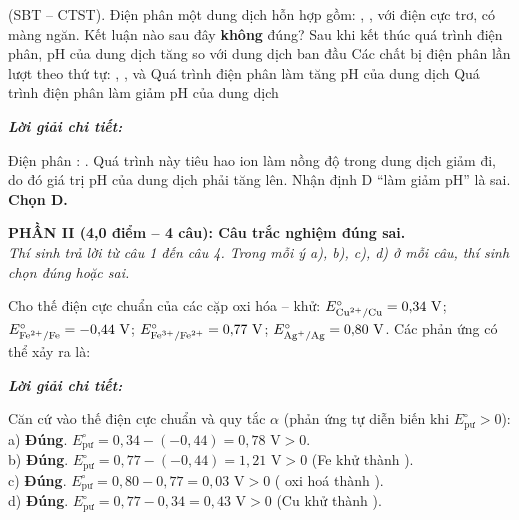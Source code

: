 \documentclass[11pt,a4paper]{article}
\def\loigiai#1{
\par\begingroup\color{blue!80!black}\small
\noindent\textbf{\textit{Lời giải chi tiết:}}\par
#1\par\endgroup}
\begin{document}
\begin{ex}
(SBT -- CTST). Điện phân một dung dịch hỗn hợp gồm: , ,  với điện cực trơ, có màng ngăn. Kết luận nào sau đây \textbf{không} đúng?
\choice
{Sau khi kết thúc quá trình điện phân, pH của dung dịch tăng so với dung dịch ban đầu}
{Các chất bị điện phân lần lượt theo thứ tự: , ,  và }
{Quá trình điện phân  làm tăng pH của dung dịch}
{\True Quá trình điện phân  làm giảm pH của dung dịch}
\loigiai{
Điện phân \ce{HCl}: . Quá trình này tiêu hao ion \ce{H+} làm nồng độ \ce{H+} trong dung dịch giảm đi, do đó giá trị pH của dung dịch phải tăng lên. Nhận định D ``làm giảm pH'' là sai.\\
\textbf{Chọn D.}}
\end{ex}



\noindent
\textbf{PHẦN II (4,0 điểm -- 4 câu): Câu trắc nghiệm đúng sai.}\\
\textit{Thí sinh trả lời từ câu 1 đến câu 4. Trong mỗi ý a), b), c), d) ở mỗi câu, thí sinh chọn đúng hoặc sai.}

\setcounter{ex}{0}

\begin{ex}
Cho thế điện cực chuẩn của các cặp oxi hóa – khử: $E^\circ_{\ce{Cu^2+/Cu}} = 0{,}34\text{ V}$; $E^\circ_{\ce{Fe^2+/Fe}} = -0{,}44\text{ V}$; $E^\circ_{\ce{Fe^3+/Fe^2+}} = 0{,}77\text{ V}$; $E^\circ_{\ce{Ag+/Ag}} = 0{,}80\text{ V}$. Các phản ứng có thể xảy ra là:
\choiceTF
{\True {}}
{\True {}}
{\True {}}
{\True {}}
\loigiai{
Căn cứ vào thế điện cực chuẩn và quy tắc $\alpha$ (phản ứng tự diễn biến khi $E^\circ_{\text{pư}} > 0$):\\
a) \textbf{Đúng}. $E^\circ_{\text{pư}} = 0{,}34 - (-0{,}44) = 0{,}78\text{ V} > 0$.\\
b) \textbf{Đúng}. $E^\circ_{\text{pư}} = 0{,}77 - (-0{,}44) = 1{,}21\text{ V} > 0$ (Fe khử \ce{Fe^3+} thành \ce{Fe^2+}).\\
c) \textbf{Đúng}. $E^\circ_{\text{pư}} = 0{,}80 - 0{,}77 = 0{,}03\text{ V} > 0$ (\ce{Ag+} oxi hoá \ce{Fe^2+} thành \ce{Fe^3+}).\\
d) \textbf{Đúng}. $E^\circ_{\text{pư}} = 0{,}77 - 0{,}34 = 0{,}43\text{ V} > 0$ (Cu khử \ce{Fe^3+} thành \ce{Fe^2+}).}
\end{ex}
\end{document}
